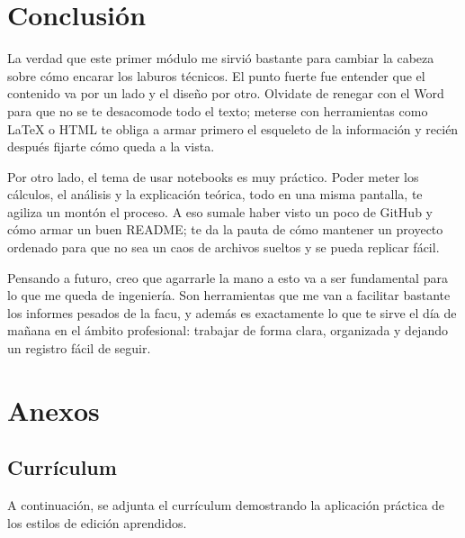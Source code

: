 \documentclass[runningheads]{llncs}
\begin{document}
\section{Conclusión}

La verdad que este primer módulo me sirvió bastante para cambiar la cabeza sobre cómo encarar los laburos técnicos. El punto fuerte fue entender que el contenido va por un lado y el diseño por otro. Olvidate de renegar con el Word para que no se te desacomode todo el texto; meterse con herramientas como LaTeX o HTML te obliga a armar primero el esqueleto de la información y recién después fijarte cómo queda a la vista.

Por otro lado, el tema de usar notebooks es muy práctico. Poder meter los cálculos, el análisis y la explicación teórica, todo en una misma pantalla, te agiliza un montón el proceso. A eso sumale haber visto un poco de GitHub y cómo armar un buen README; te da la pauta de cómo mantener un proyecto ordenado para que no sea un caos de archivos sueltos y se pueda replicar fácil.

Pensando a futuro, creo que agarrarle la mano a esto va a ser fundamental para lo que me queda de ingeniería. Son herramientas que me van a facilitar bastante los informes pesados de la facu, y además es exactamente lo que te sirve el día de mañana en el ámbito profesional: trabajar de forma clara, organizada y dejando un registro fácil de seguir.

\section{Anexos}

\subsection{Currículum}
A continuación, se adjunta el currículum demostrando la aplicación práctica de los estilos de edición aprendidos.





\end{document}
